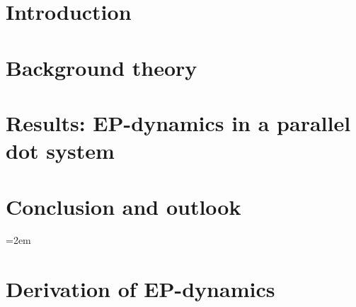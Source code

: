 \documentclass[12pt, twoside]{report}
\begin{document}

\newpage
{}

\newpage
{
    \hypersetup{linkcolor=black}
    \tableofcontents
}
\newpage
{}
\chapter{Introduction}

\chapter{Background theory}\label{sec:theory}

\chapter{Results: EP-dynamics in a parallel dot system}\label{sec:dyn}


\chapter{Conclusion and outlook}\label{sec:conc}


\newpage
\emergencystretch=2em
\printbibliography
\appendix
\chapter{Derivation of EP-dynamics}

\end{document}
